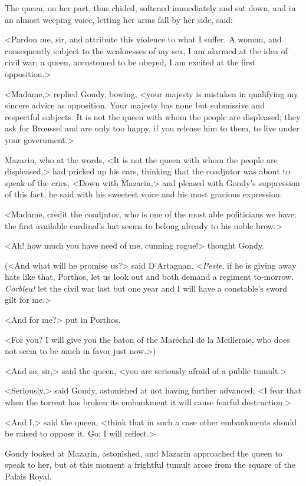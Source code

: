 The queen, on her part, thus chided, softened immediately and sat down, and in an almost weeping voice, letting her arms fall by her side, said:

<Pardon me, sir, and attribute this violence to what I suffer. A woman, and consequently subject to the weaknesses of my sex, I am alarmed at the idea of civil war; a queen, accustomed to be obeyed, I am excited at the first opposition.>

<Madame,> replied Gondy, bowing, <your majesty is mistaken in qualifying my sincere advice as opposition. Your majesty has none but submissive and respectful subjects. It is not the queen with whom the people are displeased; they ask for Broussel and are only too happy, if you release him to them, to live under your government.>

Mazarin, who at the words, <It is not the queen with whom the people are displeased,> had pricked up his ears, thinking that the coadjutor was about to speak of the cries, <Down with Mazarin,> and pleased with Gondy's suppression of this fact, he said with his sweetest voice and his most gracious expression:

<Madame, credit the coadjutor, who is one of the most able politicians we have; the first available cardinal's hat seems to belong already to his noble brow.>

<Ah! how much you have need of me, cunning rogue!> thought Gondy.

(<And what will he promise us?> said D'Artagnan. <\textit{Peste}, if he is giving away hats like that, Porthos, let us look out and both demand a regiment to-morrow. \textit{Corbleu!} let the civil war last but one year and I will have a constable's sword gilt for me.>

<And for me?> put in Porthos.

<For you? I will give you the baton of the Maréchal de la Meilleraie, who does not seem to be much in favor just now.>)

<And so, sir,> said the queen, <you are seriously afraid of a public tumult.>

<Seriously,> said Gondy, astonished at not having further advanced; <I fear that when the torrent has broken its embankment it will cause fearful destruction.>

<And I,> said the queen, <think that in such a case other embankments should be raised to oppose it. Go; I will reflect.>

Gondy looked at Mazarin, astonished, and Mazarin approached the queen to speak to her, but at this moment a frightful tumult arose from the square of the Palais Royal.

